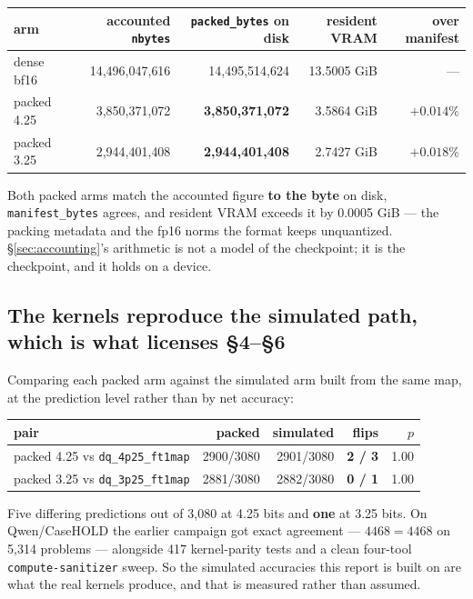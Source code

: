 \documentclass[11pt]{article}
\newcommand{\code}[1]{\texttt{#1}}
\newcommand{\best}[1]{\textbf{#1}}
\begin{document}
\begin{center}\small
\begin{tabular}{@{}lrrrr@{}}
\toprule
arm & accounted \code{nbytes} & \code{packed\_bytes} on disk & resident VRAM & over manifest \\
\midrule
dense bf16 & 14{,}496{,}047{,}616 & 14{,}495{,}514{,}624 & 13.5005 GiB & --- \\
packed 4.25 & 3{,}850{,}371{,}072 & \best{3{,}850{,}371{,}072} & 3.5864 GiB & $+0.014\%$ \\
packed 3.25 & 2{,}944{,}401{,}408 & \best{2{,}944{,}401{,}408} & 2.7427 GiB & $+0.018\%$ \\
\bottomrule
\end{tabular}
\end{center}

Both packed arms match the accounted figure \textbf{to the byte} on disk, \code{manifest\_bytes}
agrees, and resident VRAM exceeds it by 0.0005 GiB --- the packing metadata and the fp16 norms
the format keeps unquantized. \S\ref{sec:accounting}'s arithmetic is not a model of the
checkpoint; it is the checkpoint, and it holds on a device.

\subsection{The kernels reproduce the simulated path, which is what licenses \S4--\S6}

Comparing each packed arm against the simulated arm built from the same map, at the prediction
level rather than by net accuracy:

\begin{center}\small
\begin{tabular}{@{}lrrrr@{}}
\toprule
pair & packed & simulated & flips & $p$ \\
\midrule
packed 4.25 vs \code{dq\_4p25\_ft1map} & 2900/3080 & 2901/3080 & \textbf{2 / 3} & 1.00 \\
packed 3.25 vs \code{dq\_3p25\_ft1map} & 2881/3080 & 2882/3080 & \textbf{0 / 1} & 1.00 \\
\bottomrule
\end{tabular}
\end{center}

Five differing predictions out of 3{,}080 at 4.25 bits and \textbf{one} at 3.25 bits. On
Qwen/CaseHOLD the earlier campaign got exact agreement --- $4468 = 4468$ on 5{,}314 problems ---
alongside 417 kernel-parity tests and a clean four-tool \code{compute-sanitizer} sweep. So the
simulated accuracies this report is built on are what the real kernels produce, and that is
measured rather than assumed.
\end{document}
